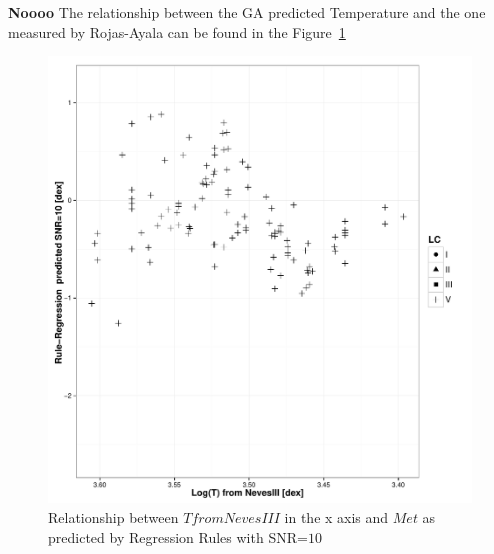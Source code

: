 {\bf Noooo}
The relationship between the GA predicted Temperature and the one measured by Rojas-Ayala can be 
found in the Figure~\ref{fig:ipac_mt}
\begin{figure}
 \begin{center}
 \includegraphics[width=12cm]{figs/ipac_Met_10_NevesIII.pdf}
 \caption{Relationship between $ T from NevesIII $ in the x axis 
 and $ Met $ as predicted by Regression Rules with SNR=$10$}
 \label{fig:ipac_mt}
 \end{center}
\end{figure}



%
   
   


